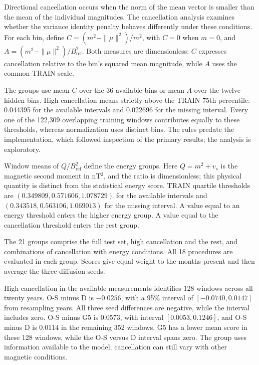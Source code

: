 \documentclass{article}
\begin{document}
Directional cancellation occurs when the norm of the mean vector is smaller than the mean of the individual magnitudes. The cancellation analysis examines whether the variance identity penalty behaves differently under these conditions. For each bin, define $C=(m^2-\|\mu\|^2)/m^2$, with $C=0$ when $m=0$, and $A=(m^2-\|\mu\|^2)/B_{\mathrm{ref}}^2$. Both measures are dimensionless: $C$ expresses cancellation relative to the bin's squared mean magnitude, while $A$ uses the common TRAIN scale.

The groups use mean $C$ over the 36 available bins or mean $A$ over the twelve hidden bins. High cancellation means strictly above the TRAIN 75th percentile: 0.044395 for the available intervals and 0.022696 for the missing interval. Every one of the 122{,}309 overlapping training windows contributes equally to these thresholds, whereas normalization uses distinct bins. The rules predate the implementation, which followed inspection of the primary results; the analysis is exploratory.

Window means of $Q/B_{\mathrm{ref}}^2$ define the energy groups. Here $Q=m^2+v_s$ is the magnetic second moment in nT$^2$, and the ratio is dimensionless; this physical quantity is distinct from the statistical energy score. TRAIN quartile thresholds are $(0.349809,0.571606,1.078729)$ for the available intervals and $(0.343518,0.563106,1.069013)$ for the missing interval. A value equal to an energy threshold enters the higher energy group. A value equal to the cancellation threshold enters the rest group.

The 21 groups comprise the full test set, high cancellation and the rest, and combinations of cancellation with energy conditions. All 18 procedures are evaluated in each group. Scores give equal weight to the months present and then average the three diffusion seeds.

\begin{samepage}
High cancellation in the available measurements identifies 128 windows across all twenty years. O-S minus D is $-0.0256$, with a 95\% interval of $[-0.0740,0.0147]$ from resampling years. All three seed differences are negative, while the interval includes zero. O-S minus G5 is $0.0573$, with interval $[0.0053,0.1246]$, and O-S minus D is $0.0114$ in the remaining 352 windows. G5 has a lower mean score in these 128 windows, while the O-S versus D interval spans zero. The group uses information available to the model; cancellation can still vary with other magnetic conditions.
\par
\end{samepage}
\end{document}
